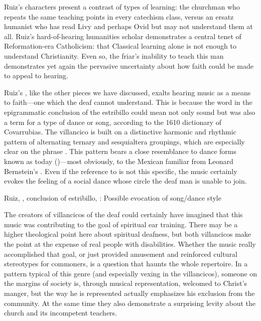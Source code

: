 Ruiz's characters present a contrast of types of learning: the churchman who repeats the same teaching points in every catechism class, versus an ersatz humanist who has read Livy and perhaps Ovid but may not understand them at all.
Ruiz's hard-of-hearing humanities scholar demonstrates a central tenet of Reformation-era Catholicism: that Classical learning alone is not enough to understand Christianity.
Even so, the friar's inability to teach this man demonstrates yet again the pervasive uncertainty about how faith could be made to appeal to hearing.

Ruiz's , like the other pieces we have discussed, exalts hearing music as a means to faith---one which the deaf cannot understand.
This is because the word  in the epigrammatic conclusion of the estribillo could mean not only sound but was also a term for a type of dance or song, according to the 1610 dictionary of Covarrubias.
The villancico is built on a distinctive harmonic and rhythmic pattern of alternating ternary and sesquialtera groupings, which are especially clear on the phrase .
This pattern bears a close resemblance to dance forms known as  today ()---most obviously, to the Mexican  familiar from Leonard Bernstein's .
Even if the reference to  is not this specific, the music certainly evokes the feeling of a social dance whose circle the deaf man is unable to join.


\begin{exmusic}
\caption{Ruiz, , conclusion of estribillo, : Possible evocation of  song/dance style}
\label{exmusic:Ruiz-Sordos-son}
\end{exmusic}

The creators of villancicos of the deaf could certainly have imagined that this music was contributing to the goal of spiritual ear training.
There may be a higher theological point here about spiritual deafness, but both  villancicos make the point at the expense of real people with disabilities.
Whether the music really accomplished that goal, or just provided amusement and reinforced cultural stereotypes for commoners, is a question that haunts the whole repertoire.
In a pattern typical of this genre (and especially vexing in the  villancicos), someone on the margins of society is, through musical representation, welcomed to Christ's manger, but the way he is represented actually emphasizes his exclusion from the community.
At the same time they also demonstrate a surprising levity about the church and its incompetent teachers.


